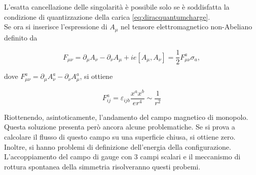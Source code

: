 L'esatta cancellazione delle singolarità è possibile solo se è soddisfatta la condizione
di quantizzazione della carica \ref{eq:diracquantumcharge}.\\

Se ora si inserisce l'espressione di $A _\mu$ nel tensore elettromagnetico non-Abeliano
definito da

\begin{equation}
   F_{\mu\nu} = \partial _\mu A_\nu - \partial _\nu A _\mu + i e [A_\mu,A_\nu]
              = \frac{1}{2} F_{\mu\nu}^a \sigma _a ,
\end{equation}

dove $F_{\mu\nu}^a = \partial _\mu A_\nu^a - \partial _\nu A_\mu^a$, si ottiene

\begin{equation}
   F^a_{ij} = \varepsilon_{ijb} \frac{x^a x^b}{e r^4} \sim \frac{1}{r^2}
\end{equation}

Riottenendo, asintoticamente, l'andamento del campo magnetico di monopolo.\\

Questa soluzione presenta però ancora alcune problematiche. Se si prova a calcolare
il flusso di questo campo su una superficie chiusa, si ottiene zero. Inoltre, si
hanno problemi di definizione dell'energia della configurazione.\\

L'accoppiamento del campo di gauge con 3 campi scalari e il meccanismo di
rottura spontanea della simmetria risolveranno questi probemi.
